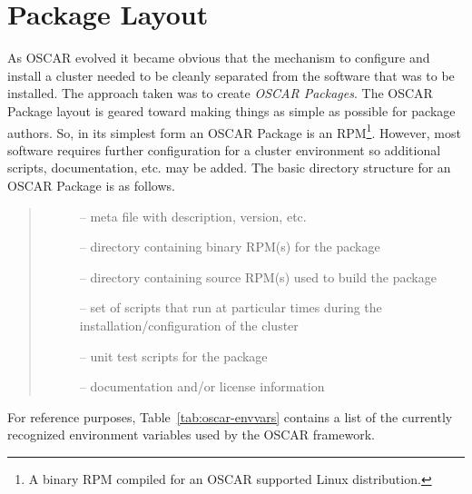 
 
\section{Package Layout}
\label{sect:pkg-layout}

As OSCAR evolved it became obvious that the mechanism to configure and
install a cluster needed to be cleanly separated from the software that was
to be installed.  The approach taken was to create \emph{OSCAR Packages}.
The OSCAR Package layout is geared toward making things as simple as
possible for package authors.  So, in its simplest form an OSCAR Package is
an RPM\footnote{A binary RPM compiled for an OSCAR supported Linux
distribution.}.  However, most software requires further configuration for
a cluster environment so additional scripts, documentation, etc. may be
added.  The basic directory structure for an OSCAR Package is as follows.

\begin{quote}
\begin{description}
  \item[] -- meta file with description, version, etc.
  \item[] -- directory containing binary RPM(s) for the package
  \item[] -- directory containing source RPM(s) used to build
                            the package
  \item[] --  set of scripts that run at particular times
                     during the installation/configuration of the cluster
  \item[] -- unit test scripts for the package
  \item[] -- documentation and/or license information
\end{description}
\end{quote}

\noindent For reference purposes, Table~\ref{tab:oscar-envvars}
contains a list of the currently recognized environment variables used by
the OSCAR framework.



